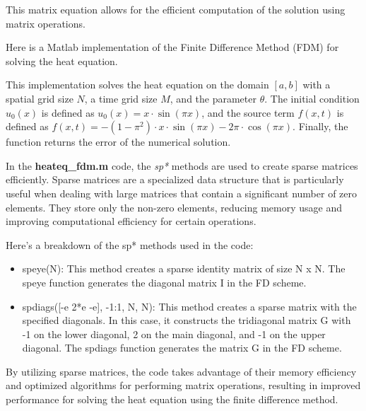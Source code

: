 This matrix equation allows for the efficient computation of the solution using matrix operations.


Here is a Matlab implementation of the Finite Difference Method (FDM) for solving the heat equation.

This implementation solves the heat equation on the domain $[a, b]$ with a spatial grid size $N$, a time grid size $M$, and the parameter $\theta$. The initial condition $u_0(x)$ is defined as $u_0(x) = x \cdot \sin(\pi x)$, and the source term $f(x, t)$ is defined as $f(x, t) = -(1-\pi^2) \cdot x \cdot \sin(\pi x) - 2\pi \cdot \cos(\pi x)$. Finally, the function returns the error of the numerical solution.

\newpage



In the \textbf{heateq\_fdm.m} code, the \textit{sp*} methods are used to create sparse matrices efficiently. Sparse matrices are a specialized data structure that is particularly useful when dealing with large matrices that contain a significant number of zero elements. They store only the non-zero elements, reducing memory usage and improving computational efficiency for certain operations.

Here's a breakdown of the sp* methods used in the code:

\begin{itemize}
    \item speye(N): This method creates a sparse identity matrix of size N x N. The speye function generates the diagonal matrix I in the FD scheme.
    \item spdiags([-e 2*e -e], -1:1, N, N): This method creates a sparse matrix with the specified diagonals. In this case, it constructs the tridiagonal matrix G with -1 on the lower diagonal, 2 on the main diagonal, and -1 on the upper diagonal. The spdiags function generates the matrix G in the FD scheme.
\end{itemize}

By utilizing sparse matrices, the code takes advantage of their memory efficiency and optimized algorithms for performing matrix operations, resulting in improved performance for solving the heat equation using the finite difference method.

